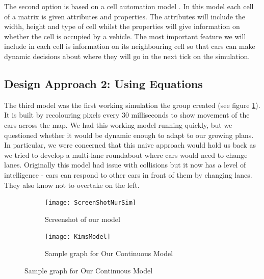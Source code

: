 \documentclass[11pt]{article}
\begin{document}
	
	The second option is based on a cell automation model \cite{namekawa2005general}. In this model each cell of a matrix is given attributes and properties. The attributes will include the width, height and type of cell whilst the properties will give information on whether the cell is occupied by a vehicle. The most important feature we will include in each cell is information on its neighbouring cell so that cars can make dynamic decisions about where they will go in the next tick on the simulation.
	
	
	\subsection{Design Approach 2: Using Equations}
	\FloatBarrier
	
	
    The third model was the first working simulation the group created (see figure \ref{NurScreenshot}). It is built by recolouring pixels every 30 milliseconds to show movement of the cars across the map. We had this working model running quickly, but we questioned whether it would be dynamic enough to adapt to our growing plans. In particular, we were concerned that this naive approach would hold us back as we tried to develop a multi-lane roundabout where cars would need to change lanes. Originally this model had issue with collisions but it now has a level of intelligence - cars can respond to other cars in front of them by changing lanes. They also know not to overtake on the left. 	
\begin{figure}
	
	\centering
	\begin{subfigure}{.35\textwidth}
		\centering
		\texttt{[image: ScreenShotNurSim]}
		\caption{Screenshot of  our model }
		\label{NurScreenshot}
	\end{subfigure}
	\begin{subfigure}{.35\textwidth}
		\centering
		\texttt{[image: KimsModel]}
		\caption{Sample graph for Our Continuous Model}
		\label{KimModel}
	\end{subfigure}
\end{figure}	
%		
\end{document}
